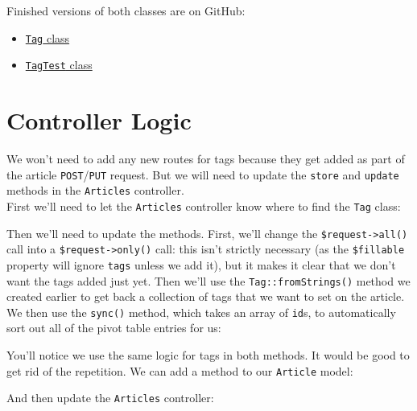 Finished versions of both classes are on GitHub:

\begin{itemize}
    \item \href{https://github.com/develop-me/bootcamp--laravel-project/blob/develop/app/Models/Tag.php}{\texttt{Tag} class}
    \item \href{https://github.com/develop-me/bootcamp--laravel-project/blob/develop/tests/Unit/TagTest.php}{\texttt{TagTest} class}
\end{itemize}


\section{Controller Logic}

We won't need to add any new routes for tags because they get added as part of the article \texttt{POST}/\texttt{PUT} request. But we will need to update the \texttt{store} and \texttt{update} methods in the \texttt{Articles} controller.
\\

First we'll need to let the \texttt{Articles} controller know where to find the \texttt{Tag} class:


Then we'll need to update the methods. First, we'll change the \texttt{\$request->all()} call into a \texttt{\$request->only()} call: this isn't strictly necessary (as the \texttt{\$fillable} property will ignore \texttt{tags} unless we add it), but it makes it clear that we don't want the tags added just yet. Then we'll use the \texttt{Tag::fromStrings()} method we created earlier to get back a collection of tags that we want to set on the article. We then use the \texttt{sync()} method, which takes an array of \texttt{id}s, to automatically sort out all of the pivot table entries for us:


You'll notice we use the same logic for tags in both methods. It would be good to get rid of the repetition. We can add a method to our \texttt{Article} model:


And then update the \texttt{Articles} controller:



